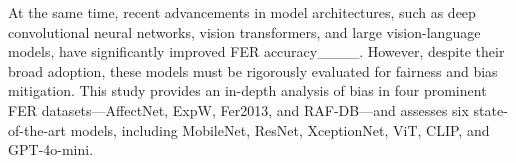 At the same time, recent advancements in model architectures, such as deep convolutional neural networks, vision transformers, and large vision-language models, have significantly improved FER accuracy____. However, despite their broad adoption, these models must be rigorously evaluated for fairness and bias mitigation. This study provides an in-depth analysis of bias in four prominent FER datasets—AffectNet, ExpW, Fer2013, and RAF-DB—and assesses six state-of-the-art models, including MobileNet, ResNet, XceptionNet, ViT, CLIP, and GPT-4o-mini.

